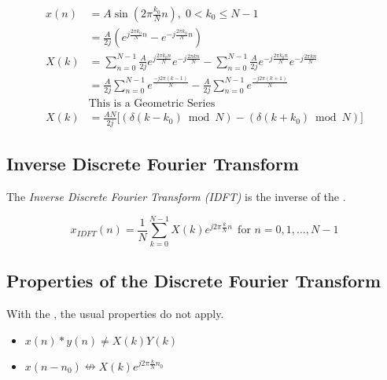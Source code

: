 \begin{equation}\label{eq:DFT_of_Sine}
  \begin{aligned}
    x(n) &= A \sin \left( 2\pi \frac{k_{0}}{N} n \right),\; 0 < k_{0} \leq N-1 \\
    &= \frac{A}{2j} \left( e^{j \frac{2\pi k_{0}}{N} n} - e^{-j \frac{2\pi k_{0}}{N} n} \right) \\
    X(k) &= \sum\limits_{n=0}^{N-1} \frac{A}{2j} e^{j \frac{2\pi k_{0} n}{N}} e^{-j \frac{2\pi k n}{N}} - \sum\limits_{n=0}^{N-1} \frac{A}{2j} e^{-j \frac{2\pi k_{0} n}{N}} e^{-j \frac{2\pi k n}{N}} \\
    &= \frac{A}{2j} \sum\limits_{n=0}^{N-1} e^{\frac{-j 2\pi (k-1)}{N}} - \frac{A}{2j} \sum\limits_{n=0}^{N-1} e^{\frac{-j 2\pi (k+1)}{N}} \\
    &\text{This is a Geometric Series} \\
    X(k) &= \frac{AN}{2j} \biggl[ (\delta(k-k_{0}) \bmod N) - (\delta(k+k_{0}) \bmod N) \biggr]
  \end{aligned}
\end{equation}

\subsection{Inverse Discrete Fourier Transform}\label{subsec:IDFT}
\begin{definition}\label{def:IDFT}
  The \emph{Inverse Discrete Fourier Transform (IDFT)} is the inverse of the .

  \begin{equation}\label{eq:IDFT}
    x_{IDFT}(n) = \frac{1}{N} \sum\limits_{k=0}^{N-1} X(k) e^{j 2\pi \frac{k}{N} n} \:\: \text{for } n = 0, 1, \ldots, N-1
  \end{equation}
\end{definition}

\subsection{Properties of the Discrete Fourier Transform}\label{subsec:DFT_Properties}
With the , the usual properties do not apply.
\begin{itemize}[noitemsep]
\item $x(n) * y(n) \neq X(k)Y(k)$
\item $x(n-n_{0}) \nleftrightarrow X(k) e^{j 2\pi \frac{k}{N} n_{0}}$
\end{itemize}

